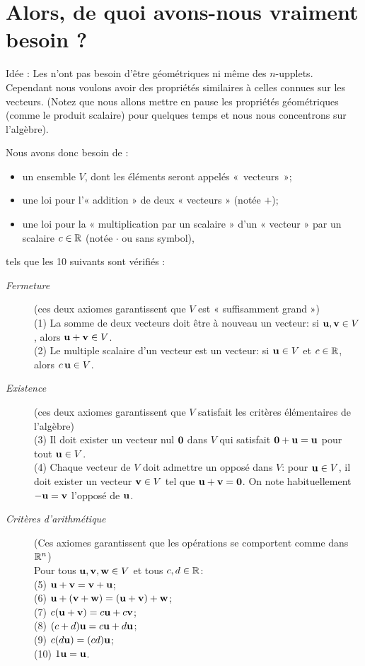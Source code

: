  

\section{Alors, de quoi avons-nous vraiment besoin ?}
Idée :  Les  n'ont pas besoin d'être géométriques ni même des $n$-upplets.
Cependant nous voulons avoir des propriétés similaires à celles connues sur les vecteurs.
(Notez que nous allons mettre en pause les propriétés géométriques (comme le produit scalaire) pour quelques temps et nous nous concentrons sur l'algèbre).

Nous avons donc besoin de : 
\begin{itemize}
\item un ensemble $V$, dont les éléments seront appelés «~vecteurs~»;
\item une loi pour l'« addition » de deux « vecteurs » (notée $+$);
\item une loi pour la « multiplication par un scalaire » d'un « vecteur » par un scalaire $c\in \mathbb{R}$ (notée $\cdot$ ou sans symbol),
\end{itemize}
tels que les 10  suivants sont vérifiés :
\begin{description}
\item[\it Fermeture] (ces deux axiomes garantissent que $V$ est « suffisamment grand ») \\
(1) La somme de deux vecteurs doit être à nouveau un vecteur: si $\mathbf{u}, \mathbf{v} \in V$, alors $\mathbf{u} + \mathbf{v} \in V$.\\
(2) Le multiple scalaire d'un vecteur est un vecteur: si $\mathbf{u} \in V$ et $c\in \mathbb{R}$, alors $c\,\mathbf{u} \in V$.
\item[\it Existence] (ces deux axiomes garantissent que $V$ satisfait les crit\`eres élémentaires de l'algèbre)\\
(3) Il doit exister un vecteur nul $\mathbf{0}$ dans $V$ qui satisfait
$\mathbf{0} + \mathbf{u} = \mathbf{u}$ pour tout $\mathbf{u} \in V$.\\
(4) Chaque vecteur de $V$ doit admettre un oppos\'e dans $V$: pour $\mathbf{u} \in V$, il doit exister un vecteur $\mathbf{v} \in V$  tel que $\mathbf{u} + \mathbf{v} = \mathbf{0}$. On note habituellement $-\mathbf{u}=\mathbf{v}$ l'opposé de $\mathbf{u}$.
\item[\it Crit\`eres d'arithmétique] (Ces axiomes garantissent que les opérations se comportent comme dans $\mathbb{R}^n$) \\
Pour tous $\mathbf{u}, \mathbf{v}, \mathbf{w} \in V$ et tous $c,d\in\mathbb{R}$:\\
(5) $\mathbf{u} + \mathbf{v} = \mathbf{v} + \mathbf{u}$;\\
(6) $\mathbf{u} + (\mathbf{v} + \mathbf{w}) = (\mathbf{u}+\mathbf{v})+\mathbf{w}$;\\
(7) $c(\mathbf{u} + \mathbf{v}) = c\mathbf{u} + c\mathbf{v}$;\\
(8) $(c+d)\mathbf{u} = c\mathbf{u} + d\mathbf{u}$;\\
(9) $c(d\mathbf{u}) = (cd)\mathbf{u}$;\\
(10) $1\mathbf{u} = \mathbf{u}$.
\end{description}

